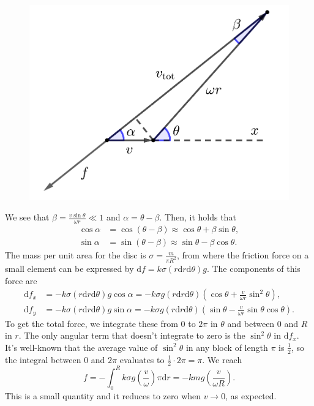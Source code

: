 \documentclass[../TST.tex]{subfiles}
\begin{document}
\begin{solution}
\begin{figure}[h]
\begin{minipage}[b]{0.5\textwidth}
		\centering
\includegraphics[width=\textwidth]{fig/a2016_s22.pdf}
	\end{minipage}
\end{figure}

We see that $\beta = \frac{v\sin{\theta}}{\omega r}\ll 1$ and $\alpha = \theta - \beta$. Then, it holds that
\begin{align*}
	\cos{\alpha}&=\cos{(\theta-\beta)}\approx \cos{\theta}+\beta\sin{\theta},\\
	\sin{\alpha}&=\sin{(\theta-\beta)}\approx \sin{\theta}-\beta\cos{\theta}
.
\end{align*}
The mass per unit area for the disc is $\sigma=\frac{m}{\pi R^2}$, from where the friction force on a small element can be expressed by $\mathrm{d}f=k\sigma (r \mathrm{d}r \mathrm{d}\theta)g$. The components of this force are
\begin{align*}
	\mathrm{d}f_x&=-k\sigma (r \mathrm{d}r \mathrm{d}\theta)g\cos{\alpha}=-k\sigma g (r \mathrm{d}r \mathrm{d}\theta)\left(\cos{\theta}+\frac{v}{\omega r}\sin^2{\theta}\right),\\
	\mathrm{d}f_y&=-k\sigma (r \mathrm{d}r \mathrm{d}\theta)g\sin{\alpha}=-k\sigma g (r \mathrm{d}r \mathrm{d}\theta)\left(\sin{\theta}-\frac{v}{\omega r}\sin{\theta}\cos{\theta}\right) .
\end{align*}
To get the total force, we integrate these from $0$ to $2\pi$ in $\theta$ and between $0$ and $R$ in $r$. The only angular term that doesn't integrate to zero is the $\sin^2{\theta}$ in $\mathrm{d}f_x$. It's well-known that the average value of $\sin^2{\theta}$ in any block of length $\pi$ is $\frac{1}{2}$, so the integral between  $0$ and $2\pi$ evaluates to $\frac{1}{2}\cdot 2\pi = \pi$. We reach
\begin{equation*}
	f=-\int_0^R k\sigma g \left(\frac{v}{\omega}\right) \pi \mathrm{d}r=\boxed{-kmg \left(\frac{v}{\omega R}\right).}
\end{equation*}
This is a small quantity and it reduces to zero when $v\rightarrow 0$, as expected.
\end{solution}
\fi
\end{document}
